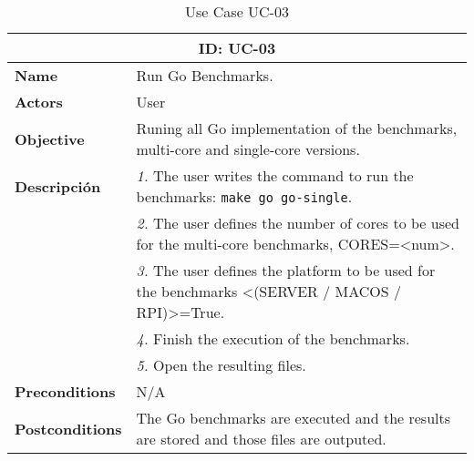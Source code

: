 \begin{table}[H]
    \centering
    \begin{tabular}{l p{10cm}}
        \toprule
        \multicolumn{2}{c}{\textbf{ID: UC-03}} \\
        \toprule
        \textbf{Name}                         &  Run Go Benchmarks. \\
        \textbf{Actors}                       &  User \\
        \textbf{Objective}                    &  Runing all Go implementation of the benchmarks, multi-core and single-core versions. \\
        \multirow{1}{*}{\textbf{Descripción}} & \textsl{1.} The user writes the command to run the benchmarks: \texttt{make go go-single}.\\
                                              & \textsl{2.} The user defines the number of cores to be used for the multi-core benchmarks, CORES=<num>.\\
                                              & \textsl{3.} The user defines the platform to be used for the benchmarks <(SERVER / MACOS / RPI)>=True.\\
                                              & \textsl{4.} Finish the execution of the benchmarks.\\
                                              & \textsl{5.} Open the resulting files.\\ 
        \textbf{Preconditions}                &  N/A \\
        \textbf{Postconditions}               &  The Go benchmarks are executed and the results are stored and those files are outputed. \\
    \end{tabular}
    \caption{Use Case UC-03}
    \label{tab:uc-03}
\end{table}


